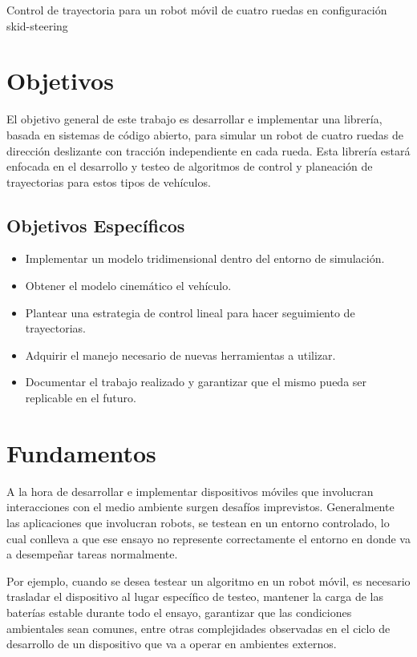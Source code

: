 \documentclass[12pt,a4paper,onecolumn]{article}%
\author{Sansoni Sebastian}
\begin{document}
\begin{center}
\begin{Large}
Control de trayectoria para un robot móvil de cuatro ruedas en configuración skid-steering  
\end{Large}
\end{center}

\section{Objetivos}
El objetivo general de este trabajo es desarrollar e implementar una librería, basada en sistemas de código abierto, para simular un robot de cuatro ruedas de dirección deslizante con tracción independiente en cada rueda. Esta librería estará enfocada en el desarrollo y testeo de algoritmos de control y planeación de trayectorias para estos tipos de vehículos. 
\subsection{Objetivos Específicos}
\begin{itemize}
\item Implementar un modelo tridimensional dentro del entorno de simulación.
\item Obtener el modelo cinemático el vehículo.
\item Plantear una estrategia de control lineal para hacer seguimiento de trayectorias. 
\item Adquirir el manejo necesario de nuevas herramientas a utilizar.
\item Documentar el trabajo realizado y garantizar que el mismo pueda ser replicable en el futuro.
\end{itemize}
\section{Fundamentos}
A la hora de desarrollar e implementar dispositivos móviles que involucran interacciones con el medio ambiente surgen desafíos imprevistos. Generalmente las aplicaciones que involucran robots, se testean en un entorno controlado, lo cual conlleva a que ese ensayo no represente correctamente el entorno en donde va a desempeñar tareas normalmente. 

Por ejemplo,  cuando se desea testear un algoritmo en un robot móvil, es necesario trasladar el dispositivo al lugar específico de testeo, mantener la carga de las baterías estable durante todo el ensayo, garantizar que las condiciones ambientales sean comunes, entre otras complejidades observadas en el ciclo de desarrollo de un dispositivo que va a operar en ambientes externos.
\end{document}
